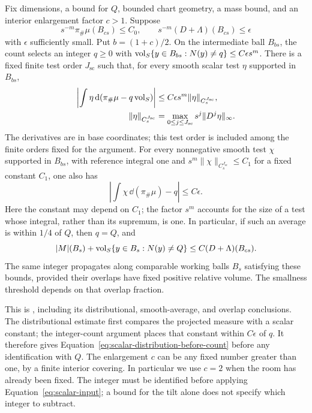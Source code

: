 \begin{lemma}\label{lem:scalar-input}
Fix dimensions, a bound for $Q$, bounded chart geometry, a mass bound, and
an interior enlargement factor $c>1$. Suppose
\[
 s^{-m}\pi_\#\mu(B_{cs})\le C_0,
 \qquad s^{-m}(D+\Lambda)(B_{cs})\le\epsilon
\]
with $\epsilon$ sufficiently small. Put $b=(1+c)/2$. On the
intermediate ball $B_{bs}$, the count selects an integer $q\ge0$ with
$\operatorname{vol}_S\{y\in B_{bs}:N(y)\ne q\}\le C\epsilon s^m$.
There is a fixed finite test order $J_{\mathrm{sc}}$ such that, for
every smooth scalar test $\eta$ supported in $B_{bs}$,
\begin{equation}\label{eq:scalar-distribution-before-count}
 \begin{aligned}
 \left|\int\eta\,\mathrm d(\pi_\#\mu-q\operatorname{vol}_S)\right|
 &\le C\epsilon s^m\|\eta\|_{C^{J_{\mathrm{sc}}}_s},\\
 \|\eta\|_{C^{J_{\mathrm{sc}}}_s}
 &=\max_{0\le j\le J_{\mathrm{sc}}}s^j\|D^j\eta\|_\infty.
 \end{aligned}
\end{equation}
The derivatives are in base coordinates; this test order is included
among the finite orders fixed for the argument.
For every nonnegative smooth test $\chi$ supported in $B_{bs}$,
with reference integral one and
$s^m\|\chi\|_{C^{J_{\mathrm{sc}}}_s}\le C_1$ for a fixed constant
$C_1$, one also has
\begin{equation}\label{eq:scalar-average-before-count}
 \left|\int\chi\,\dd(\pi_\#\mu)-q\right|\le C\epsilon.
\end{equation}
Here the constant may depend on $C_1$; the factor $s^m$ accounts for
the size of a test whose integral, rather than its supremum, is one.
In particular, if such an average is within $1/4$ of $Q$, then $q=Q$,
and
\begin{equation}\label{eq:scalar-input}
 |M|(B_s)+\operatorname{vol}_S\{y\in B_s:N(y)\ne Q\}
                     \le C(D+\Lambda)(B_{cs}).
\end{equation}
The same integer propagates along comparable working balls $B_s$
satisfying these bounds, provided their overlaps have fixed positive
relative volume. The smallness threshold depends on that overlap fraction.
\end{lemma}

This is \cite[Lemma~2.5 and its proof]{AE}, including its distributional,
smooth-average, and overlap conclusions. The distributional estimate
first compares the projected measure with a scalar constant; the
integer-count argument places that constant within $C\epsilon$ of $q$.
It therefore gives Equation~\eqref{eq:scalar-distribution-before-count}
before any identification with $Q$. The enlargement $c$ can be any
fixed number greater than one, by a finite interior covering. In
particular we use $c=2$ when the room has already been fixed. The integer
must be identified before applying Equation~\eqref{eq:scalar-input}; a
bound for the tilt alone does not specify which integer to subtract.

